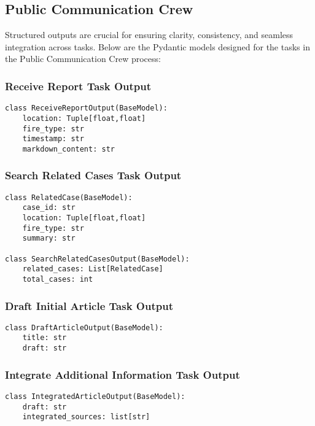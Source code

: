 \subsection{Public Communication Crew}

Structured outputs are crucial for ensuring clarity, consistency, and seamless integration across tasks. Below are the Pydantic models designed for the tasks in the Public Communication Crew process:

\subsubsection{Receive Report Task Output}
\begin{lstlisting}[caption={Pydantic model for Receive Report Task Output}]
class ReceiveReportOutput(BaseModel):
    location: Tuple[float,float]
    fire_type: str
    timestamp: str
    markdown_content: str
\end{lstlisting}

\subsubsection{Search Related Cases Task Output}
\begin{lstlisting}[caption={Pydantic model for Search Related Cases Task Output}]
class RelatedCase(BaseModel):
    case_id: str
    location: Tuple[float,float]
    fire_type: str
    summary: str

class SearchRelatedCasesOutput(BaseModel):
    related_cases: List[RelatedCase]
    total_cases: int
\end{lstlisting}

\subsubsection{Draft Initial Article Task Output}
\begin{lstlisting}[caption={Pydantic model for Draft Initial Article Task Output}]
class DraftArticleOutput(BaseModel):
    title: str
    draft: str
\end{lstlisting}

\subsubsection{Integrate Additional Information Task Output}
\begin{lstlisting}[caption={Pydantic model for Integrate Additional Information Task Output}]
class IntegratedArticleOutput(BaseModel):
    draft: str
    integrated_sources: list[str]
\end{lstlisting}

